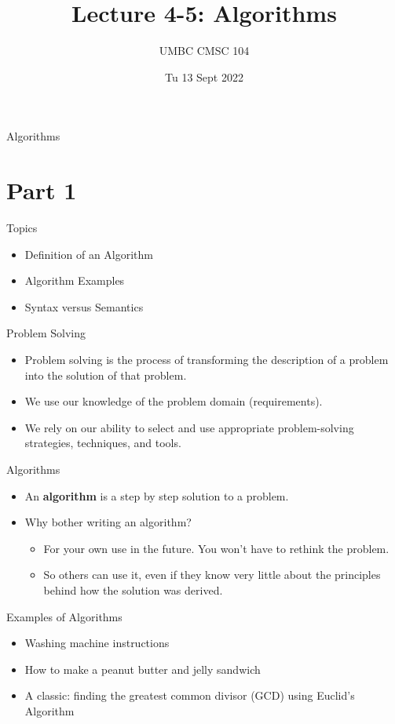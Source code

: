 \documentclass[graphics]{beamer}
\title{Lecture 4-5: Algorithms}
\author{UMBC CMSC 104}
\date{Tu 13 Sept 2022}
\begin{document}
\begin{frame}{}
\centering
    Algorithms
\end{frame}

\section*{Part 1}
\begin{frame}{Topics}
    \begin{itemize}
        \item Definition of an Algorithm
        \item Algorithm Examples
        \item Syntax versus Semantics
    \end{itemize}
\end{frame}

\begin{frame}{Problem Solving}
    \begin{itemize}
        \item Problem solving is the process of transforming the description of a problem into the solution of that problem.
        \item We use our knowledge of the problem domain (requirements).
        \item We rely on our ability to select and use appropriate problem-solving strategies, techniques, and tools.
    \end{itemize}
\end{frame}

\begin{frame}{Algorithms}
    \begin{itemize}
        \item An \textbf{algorithm} is a step by step solution to a problem.
        \item Why bother writing an algorithm?
        \begin{itemize}
            \item For your own use in the future.  You won’t have to rethink the problem.
            \item So others can use it, even if they know very little about the principles behind how the solution was derived.
        \end{itemize}
    \end{itemize}
\end{frame}

\begin{frame}{Examples of Algorithms}
    \begin{itemize}
        \item Washing machine instructions
        \item How to make a peanut butter and jelly sandwich
        \item A classic: finding the greatest common divisor (GCD) using Euclid’s Algorithm
    \end{itemize}
\end{frame}
\end{document}
